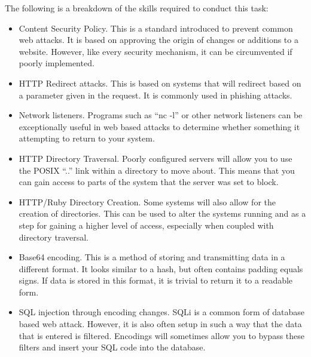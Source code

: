 \documentclass[a4paper,11pt]{report}
\begin{document}
			The following is a breakdown of the skills required to conduct this task:
			\begin{itemize}
				\item Content Security Policy.
					This is a standard introduced to prevent common web attacks. 
					It is based on approving the origin of changes or additions to a website. 
					However, like every security mechanism, it can be circumvented if poorly implemented. 
				\item HTTP Redirect attacks. 
					This is based on systems that will redirect based on a parameter given in the request. 
					It is commonly used in phishing attacks. 
				\item Network listeners. 
					Programs such as ``nc -l'' or other network listeners can be exceptionally useful in web based attacks to determine whether something it attempting to return to your system. 
				\item HTTP Directory Traversal. 
					Poorly configured servers will allow you to use the POSIX ``..'' link within a directory to move about. 
					This means that you can gain access to parts of the system that the server was set to block. 
				\item HTTP/Ruby Directory Creation. 
					Some systems will also allow for the creation of directories. 
					This can be used to alter the systems running and as a step for gaining a higher level of access, especially when coupled with directory traversal. 
				\item Base64 encoding. 
					This is a method of storing and transmitting data in a different format. 
					It looks similar to a hash, but often contains padding equals signs. 
					If data is stored in this format, it is trivial to return it to a readable form. 
				\item SQL injection through encoding changes. 
					SQLi is a common form of database based web attack. 
					However, it is also often setup in such a way that the data that is entered is filtered. 
					Encodings will sometimes allow you to bypass these filters and insert your SQL code into the database. 
			\end{itemize}
\end{document}
